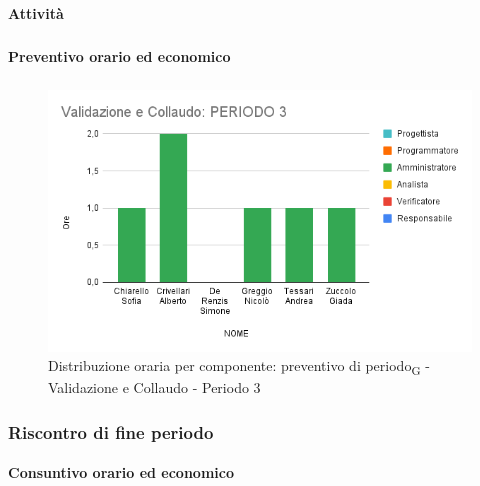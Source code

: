 \paragraph{Attività}
\subparagraph*{}

\planningTable{
	
}



\paragraph{Preventivo orario ed economico}
\subparagraph*{}

\contabilitaTable{
	
}

\begin{figure}[H]
	\centering
	\includegraphics[scale=0.6]{res/images/charts/preventivo/valid_3.png}
	\caption{Distribuzione oraria per componente: preventivo di periodo\textsubscript{G} - Validazione e Collaudo - Periodo 3}
\end{figure}



\subsubsection{Riscontro di fine periodo}


\paragraph{Consuntivo orario ed economico}
\subparagraph*{}

\contabilitaTable{
	
}


